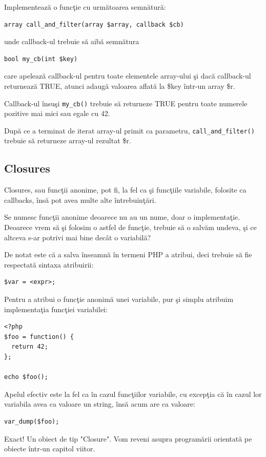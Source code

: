 \begin{Exercise}[title={Callbacks}]
Implementează o funcţie cu următoarea semnătură:
\begin{verbatim}
array call_and_filter(array $array, callback $cb)
\end{verbatim}
unde callback-ul trebuie să aibă semnătura
\begin{verbatim}
bool my_cb(int $key)
\end{verbatim}
care apelează callback-ul pentru toate elementele array-ului şi dacă
callback-ul returnează TRUE, atunci adaugă valoarea aflată la \$key
într-un array \$r.

Callback-ul însuşi \texttt{my\_cb()} trebuie să returneze TRUE pentru
toate numerele pozitive mai mici sau egale cu 42.

După ce a terminat de iterat array-ul primit ca
parametru, \texttt{call\_and\_filter()} trebuie să returneze array-ul
rezultat \$r.
\end{Exercise}


\subsection{Closures}
Closures, sau funcţii anonime, pot fi, la fel ca şi funcţiile variabile,
folosite ca callbacks, însă pot avea multe alte întrebuinţări.

Se numesc funcţii anonime deoarece nu au un nume, doar o implementaţie.
Deoarece vrem să şi folosim o astfel de funcţie, trebuie să o salvăm
undeva, şi ce altceva s-ar potrivi mai bine decât o variabilă?

De notat este că a salva înseamnă în termeni PHP a atribui, deci
trebuie să fie respectată sintaxa atribuirii:
\begin{verbatim}
$var = <expr>;
\end{verbatim}
Pentru a atribui o funcţie anonimă unei variabile, pur şi simplu
atribuim implementaţia funcţiei variabilei:
\begin{lstlisting}
<?php
$foo = function() {
  return 42;
};

echo $foo();
\end{lstlisting}
Apelul efectiv este la fel ca în cazul funcţiilor variabile,
cu excepţia că în cazul lor variabila avea ca valoare un string, însă
acum are ca valoare:
\begin{lstlisting}
var_dump($foo);
\end{lstlisting}
Exact! Un obiect de tip "Closure". Vom reveni asupra
programării orientată pe obiecte
într-un capitol viitor.

